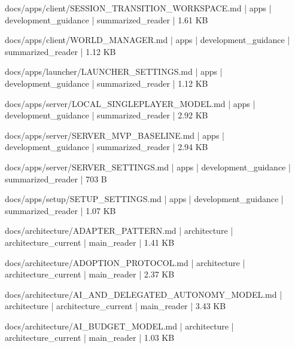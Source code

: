 \documentclass[11pt,a4paper]{report}
\begin{document}
{\small\ttfamily\raggedright docs/\allowbreak{}apps/\allowbreak{}client/\allowbreak{}SESSION\_TRANSITION\_WORKSPACE.\allowbreak{}md | apps | development\_guidance | summarized\_reader | 1.\allowbreak{}61 KB\par}
{\small\ttfamily\raggedright docs/\allowbreak{}apps/\allowbreak{}client/\allowbreak{}WORLD\_MANAGER.\allowbreak{}md | apps | development\_guidance | summarized\_reader | 1.\allowbreak{}12 KB\par}
{\small\ttfamily\raggedright docs/\allowbreak{}apps/\allowbreak{}launcher/\allowbreak{}LAUNCHER\_SETTINGS.\allowbreak{}md | apps | development\_guidance | summarized\_reader | 1.\allowbreak{}12 KB\par}
{\small\ttfamily\raggedright docs/\allowbreak{}apps/\allowbreak{}server/\allowbreak{}LOCAL\_SINGLEPLAYER\_MODEL.\allowbreak{}md | apps | development\_guidance | summarized\_reader | 2.\allowbreak{}92 KB\par}
{\small\ttfamily\raggedright docs/\allowbreak{}apps/\allowbreak{}server/\allowbreak{}SERVER\_MVP\_BASELINE.\allowbreak{}md | apps | development\_guidance | summarized\_reader | 2.\allowbreak{}94 KB\par}
{\small\ttfamily\raggedright docs/\allowbreak{}apps/\allowbreak{}server/\allowbreak{}SERVER\_SETTINGS.\allowbreak{}md | apps | development\_guidance | summarized\_reader | 703 B\par}
{\small\ttfamily\raggedright docs/\allowbreak{}apps/\allowbreak{}setup/\allowbreak{}SETUP\_SETTINGS.\allowbreak{}md | apps | development\_guidance | summarized\_reader | 1.\allowbreak{}07 KB\par}
{\small\ttfamily\raggedright docs/\allowbreak{}architecture/\allowbreak{}ADAPTER\_PATTERN.\allowbreak{}md | architecture | architecture\_current | main\_reader | 1.\allowbreak{}41 KB\par}
{\small\ttfamily\raggedright docs/\allowbreak{}architecture/\allowbreak{}ADOPTION\_PROTOCOL.\allowbreak{}md | architecture | architecture\_current | main\_reader | 2.\allowbreak{}37 KB\par}
{\small\ttfamily\raggedright docs/\allowbreak{}architecture/\allowbreak{}AI\_AND\_DELEGATED\_AUTONOMY\_MODEL.\allowbreak{}md | architecture | architecture\_current | main\_reader | 3.\allowbreak{}43 KB\par}
{\small\ttfamily\raggedright docs/\allowbreak{}architecture/\allowbreak{}AI\_BUDGET\_MODEL.\allowbreak{}md | architecture | architecture\_current | main\_reader | 1.\allowbreak{}03 KB\par}
\end{document}
